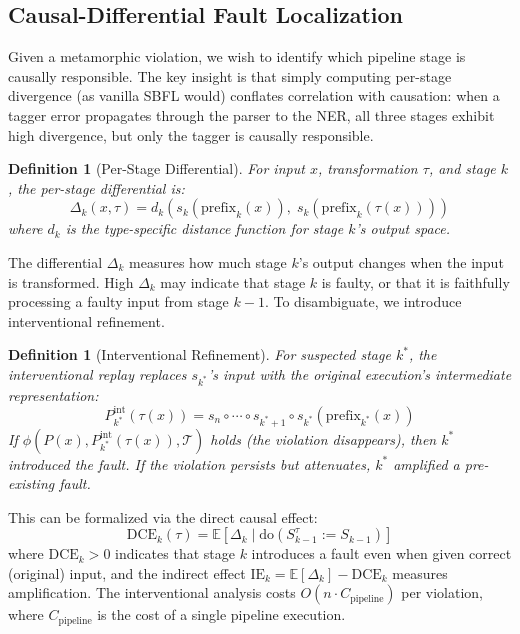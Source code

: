 \documentclass[sigconf,nonacm]{acmart}
\newtheorem{definition}[theorem]{Definition}
\begin{document}
\subsection{Causal-Differential Fault Localization}\label{sec:localization}

Given a metamorphic violation, we wish to identify which pipeline stage is causally responsible.
The key insight is that simply computing per-stage divergence (as vanilla SBFL would) conflates correlation with causation: when a tagger error propagates through the parser to the NER, all three stages exhibit high divergence, but only the tagger is causally responsible.

\begin{definition}[Per-Stage Differential]
For input $x$, transformation $\tau$, and stage $k$, the per-stage differential is:
\begin{equation}\label{eq:differential}
    \Delta_k(x, \tau) = d_k\!\left(s_k(\mathrm{prefix}_k(x)),\; s_k(\mathrm{prefix}_k(\tau(x)))\right)
\end{equation}
where $d_k$ is the type-specific distance function for stage $k$'s output space.
\end{definition}

The differential $\Delta_k$ measures how much stage $k$'s output changes when the input is transformed.
High $\Delta_k$ may indicate that stage $k$ is faulty, or that it is faithfully processing a faulty input from stage $k{-}1$.
To disambiguate, we introduce interventional refinement.

\begin{definition}[Interventional Refinement]
For suspected stage $k^*$, the \emph{interventional replay} replaces $s_{k^*}$'s input with the original execution's intermediate representation:
\begin{equation}\label{eq:intervention}
    P^{\mathrm{int}}_{k^*}(\tau(x)) = s_n \circ \cdots \circ s_{k^*+1} \circ s_{k^*}\!\left(\mathrm{prefix}_{k^*}(x)\right)
\end{equation}
If $\phi(P(x), P^{\mathrm{int}}_{k^*}(\tau(x)), \mathcal{T})$ holds (the violation disappears), then $k^*$ \emph{introduced} the fault.
If the violation persists but attenuates, $k^*$ \emph{amplified} a pre-existing fault.
\end{definition}

This can be formalized via the direct causal effect:
\begin{equation}\label{eq:dce}
    \mathrm{DCE}_{k}(\tau) = \mathbb{E}\!\left[\Delta_k \mid \mathrm{do}\!\left(S^{\tau}_{k-1} := S_{k-1}\right)\right]
\end{equation}
where $\mathrm{DCE}_k > 0$ indicates that stage $k$ introduces a fault even when given correct (original) input, and the indirect effect $\mathrm{IE}_k = \mathbb{E}[\Delta_k] - \mathrm{DCE}_k$ measures amplification.
The interventional analysis costs $O(n \cdot C_{\mathrm{pipeline}})$ per violation, where $C_{\mathrm{pipeline}}$ is the cost of a single pipeline execution.
\end{document}

